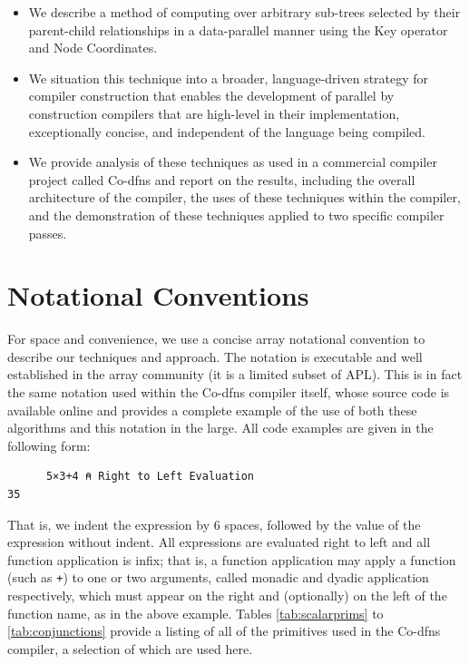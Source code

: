﻿\documentclass[numbers,10pt,preprint]{sigplanconf}
\begin{document}
\begin{itemize}[noitemsep]

\item We describe a method of computing over arbitrary sub-trees selected by their parent-child relationships in a data-parallel manner using the Key operator and Node Coordinates.

\item We situation this technique into a broader, language-driven strategy for compiler construction that enables the development of parallel by construction compilers that are high-level in their implementation, exceptionally concise, and independent of the language being compiled.

\item We provide analysis of these techniques as used in a commercial compiler project called Co-dfns and report on the results, including the overall architecture of the compiler, the uses of these techniques within the compiler, and the demonstration of these techniques applied to two specific compiler passes.

\end{itemize}

\section{Notational Conventions}

For space and convenience, we use a concise array notational convention to describe our techniques and approach. The notation is executable and well established in the array community (it is a limited subset of APL). This is in fact the same notation used within the Co-dfns compiler itself, whose source code is available online and provides a complete example of the use of both these algorithms and this notation in the large. All code examples are given in the following form:

\begin{verbatim}
      5×3+4 ⍝ Right to Left Evaluation
35
\end{verbatim}

\noindent That is, we indent the expression by 6 spaces, followed by the value of the expression without indent. All expressions are evaluated right to left and all function application is infix; that is, a function application may apply a function (such as \verb;+;) to one or two arguments, called monadic and dyadic application respectively, which must appear on the right and (optionally) on the left of the function name, as in the above example. Tables \ref{tab:scalarprims} to \ref{tab:conjunctions} provide a listing of all of the primitives used in the Co-dfns compiler, a selection of which are used here.
\end{document}
